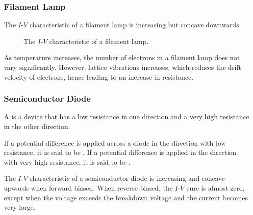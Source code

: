\subsubsection{Filament Lamp}

The $I$-$V$ characteristic of a filament lamp is increasing but concave downwards.

\begin{figure}[H]
    \centering
    \caption{The $I$-$V$ characteristic of a filament lamp.}
\end{figure}

As temperature increases, the number of electrons in a filament lamp does not vary significantly. However, lattice vibrations increases, which reduces the drift velocity of electrons, hence leading to an increase in resistance.

\subsubsection{Semiconductor Diode}

A  is a device that has a low resistance in one direction and a very high resistance in the other direction.

If a potential difference is applied across a diode in the direction with low resistance, it is said to be . If a potential difference is applied in the direction with very high resistance, it is said to be .

The $I$-$V$ characteristic of a semiconductor diode is increasing and concave upwards when forward biased. When reverse biased, the $I$-$V$ cure is almost zero, except when the voltage exceeds the breakdown voltage and the current becomes very large.

